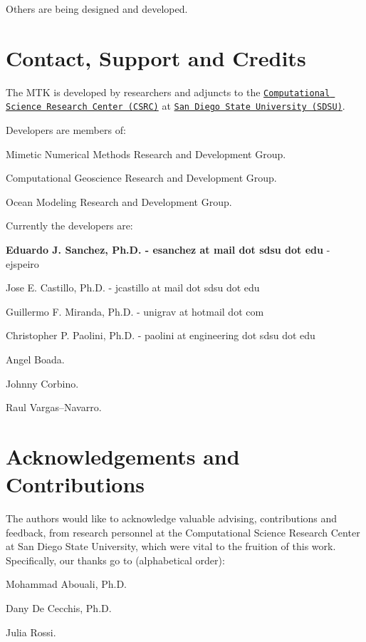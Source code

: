 Others are being designed and developed.\hypertarget{index_section_authors}{}\section{Contact, Support and Credits}\label{index_section_authors}
The M\-T\-K is developed by researchers and adjuncts to the \href{http://www.csrc.sdsu.edu/}{\tt Computational Science Research Center (C\-S\-R\-C)} at \href{http://www.sdsu.edu/}{\tt San Diego State University (S\-D\-S\-U)}.

Developers are members of\-:


\begin{DoxyEnumerate}
\item Mimetic Numerical Methods Research and Development Group.
\item Computational Geoscience Research and Development Group.
\item Ocean Modeling Research and Development Group.
\end{DoxyEnumerate}

Currently the developers are\-:


\begin{DoxyEnumerate}
\item {\bfseries Eduardo J. Sanchez, Ph.\-D. -\/ esanchez at mail dot sdsu dot edu} -\/ ejspeiro
\item Jose E. Castillo, Ph.\-D. -\/ jcastillo at mail dot sdsu dot edu
\item Guillermo F. Miranda, Ph.\-D. -\/ unigrav at hotmail dot com
\item Christopher P. Paolini, Ph.\-D. -\/ paolini at engineering dot sdsu dot edu
\item Angel Boada.
\item Johnny Corbino.
\item Raul Vargas--Navarro.
\end{DoxyEnumerate}\hypertarget{index_subsection_acknowledgements}{}\section{Acknowledgements and Contributions}\label{index_subsection_acknowledgements}
The authors would like to acknowledge valuable advising, contributions and feedback, from research personnel at the Computational Science Research Center at San Diego State University, which were vital to the fruition of this work. Specifically, our thanks go to (alphabetical order)\-:


\begin{DoxyEnumerate}
\item Mohammad Abouali, Ph.\-D.
\item Dany De Cecchis, Ph.\-D.
\item Julia Rossi. 
\end{DoxyEnumerate}